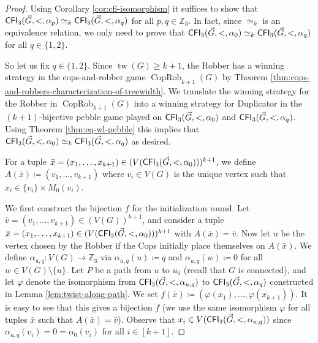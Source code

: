 \documentclass{theoretics}
\newcommand{\ZZ}{{\mathbb Z}}
\DeclareMathOperator{\CopRob}{CopRob}
\DeclareMathOperator{\tw}{tw}
\newcommand{\CFI}{{\sf CFI}}
\begin{document}
\begin{proof}
 Using Corollary \ref{cor:cfi-isomorphism} it suffices to show that $\CFI_3(\vec{G},<,\alpha_p) \simeq_k \CFI_3(\vec{G},<,\alpha_q)$ for all $p,q \in \ZZ_3$.
 In fact, since $\simeq_k$ is an equivalence relation, we only need to prove that $\CFI_3(\vec{G},<,\alpha_0) \simeq_k \CFI_3(\vec{G},<,\alpha_q)$ for all $q \in \{1,2\}$.

 So let us fix $q \in \{1,2\}$.
 Since $\tw(G) \geq k+1$, the Robber has a winning strategy in the cops-and-robber game $\CopRob_{k+1}(G)$ by Theorem \ref{thm:cops-and-robbers-characterization-of-treewidth}.
 We translate the winning strategy for the Robber in $\CopRob_{k+1}(G)$ into a winning strategy for Duplicator in the $(k+1)$-bijective pebble game played on $\CFI_3(\vec{G},<,\alpha_0)$ and $\CFI_3(\vec{G},<,\alpha_q)$.
 Using Theorem \ref{thm:eq-wl-pebble} this implies that $\CFI_3(\vec{G},<,\alpha_0) \simeq_k \CFI_3(\vec{G},<,\alpha_q)$ as desired.

 For a tuple $\bar x = (x_1,\dots,x_{k+1}) \in (V(\CFI_3(\vec{G},<,\alpha_0)))^{k+1}$, we define $A(\bar x) \coloneqq (v_1,\dots,v_{k+1})$ where $v_i \in V(G)$ is the unique vertex such that $x_i \in \{v_i\} \times M_{0}(v_i)$.

 We first construct the bijection $f$ for the initialization round.
 Let $\bar v = (v_1,\dots,v_{k+1}) \in (V(G))^{k+1}$, and consider a tuple $\bar x = (x_1,\dots,x_{k+1}) \in (V(\CFI_3(\vec{G},<,\alpha_0)))^{k+1}$ with $A(\bar x) = \bar v$.
 Now let $u$ be the vertex chosen by the Robber if the Cops initially place themselves on $A(\bar x)$.
 We define $\alpha_{u,q}\colon V(G) \to \ZZ_3$ via $\alpha_{u,q}(u) \coloneqq q$ and $\alpha_{u,q}(w) \coloneqq 0$ for all $w \in V(G) \setminus \{u\}$.
 Let $P$ be a path from $u$ to $u_0$ (recall that $G$ is connected), and let $\varphi$ denote the isomorphism from $\CFI_3(\vec{G},<,\alpha_{u,q})$ to $\CFI_3(\vec{G},<,\alpha_{q})$ constructed in Lemma \ref{lem:twist-along-path}.
 We set $f(\bar x) \coloneqq (\varphi(x_1),\dots,\varphi(x_{k+1}))$.
 It is easy to see that this gives a bijection $f$ (we use the same isomorphism $\varphi$ for all tuples $\bar x$ such that $A(\bar x) = \bar v$).
 Observe that $x_i \in V(\CFI_3(\vec{G},<,\alpha_{u,q}))$ since $\alpha_{u,q}(v_i) = 0 = \alpha_0(v_i)$ for all $i \in [k+1]$.


\end{proof}
\end{document}

